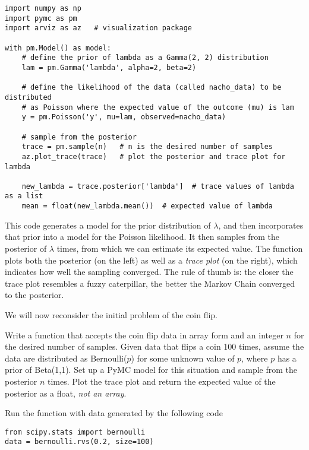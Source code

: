 \begin{lstlisting}
import numpy as np
import pymc as pm
import arviz as az   # visualization package

with pm.Model() as model:
    # define the prior of lambda as a Gamma(2, 2) distribution
    lam = pm.Gamma('lambda', alpha=2, beta=2)

    # define the likelihood of the data (called nacho_data) to be distributed
    # as Poisson where the expected value of the outcome (mu) is lam 
    y = pm.Poisson('y', mu=lam, observed=nacho_data)

    # sample from the posterior
    trace = pm.sample(n)   # n is the desired number of samples
    az.plot_trace(trace)   # plot the posterior and trace plot for lambda

    new_lambda = trace.posterior['lambda']  # trace values of lambda as a list
    mean = float(new_lambda.mean())  # expected value of lambda
\end{lstlisting}

This code generates a model for the prior distribution of $\lambda$, and then incorporates that prior into a model for the Poisson likelihood.
It then samples from the posterior of $\lambda$  times, from which we can estimate its expected value.
The function  plots both the posterior (on the left) as well as a \emph{trace plot} (on the right), which indicates how well the sampling converged.
The rule of thumb is: the closer the trace plot resembles a fuzzy caterpillar, the better the Markov Chain converged to the posterior.

We will now reconsider the initial problem of the coin flip. 

\begin{problem}
Write a function that accepts the coin flip data in array form and an integer $n$ for the desired number of samples.
Given data that flips a coin 100 times, assume the data are distributed as Bernoulli($p$) for some unknown value of $p$, where $p$ has a prior of Beta(1,1).
Set up a PyMC model for this situation and sample from the posterior $n$ times.
Plot the trace plot and return the expected value of the posterior as a float, \emph{not an array}.

Run the function with data generated by the following code 
\begin{lstlisting}
from scipy.stats import bernoulli 
data = bernoulli.rvs(0.2, size=100)
\end{lstlisting}
\end{problem} 

